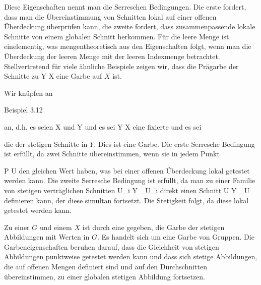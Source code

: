 Diese Eigenschaften nennt man die Serreschen Bedingungen. Die erste fordert, dass man die Übereinstimmung von Schnitten lokal auf einer offenen Überdeckung überprüfen kann, die zweite fordert, dass zusammenpassende lokale Schnitte von einem globalen Schnitt herkommen. Für die leere Menge ist
 einelementig, was mengentheoretisch aus den Eigenschaften folgt, wenn man die Überdeckung der leeren Menge mit der leeren Indexmenge betrachtet. Stellvertretend für viele ähnliche Beispiele zeigen wir, dass die Prägarbe der Schnitte zu
 {Y} {X
} {}
eine Garbe auf $X$ ist.

{





Wir knüpfen an

Beispiel 3.12

an, d.h. es seien
\mathkor {} {X} {und} {Y} {}
und es sei
 { Y } { X
} {}
eine fixierte
und es sei

 {  }

die
der stetigen Schnitte in $Y$. Dies ist eine Garbe. Die erste Serresche Bedingung ist erfüllt, da zwei Schnitte übereinstimmen, wenn sie in jedem Punkt

\mavergleichskette
{\vergleichskette
{P
}
{ \in }{ U
}
{  }{
}
{    }{
}
{   }{
}
}
{}{}{}
den gleichen Wert haben, was bei einer offenen Überdeckung lokal getestet werden kann. Die zweite Serresche Bedingung ist erfüllt, da man zu einer Familie von stetigen verträglichen Schnitten
 {U_i } { Y \vert_{U_i }
} {}
direkt einen Schnitt
 { U } { Y \vert_U
} {}
definieren kann, der diese simultan fortsetzt. Die Stetigkeit folgt, da diese lokal getestet werden kann.





}

{





Zu einer
$G$ und einem
$X$ ist durch
 eine
gegeben, die Garbe der stetigen Abbildungen mit Werten in $G$. Es handelt sich um eine Garbe von Gruppen. Die Garbeneigenschaften beruhen darauf, dass die Gleichheit von stetigen Abbildungen punktweise getestet werden kann und dass sich stetige Abbildungen, die auf offenen Mengen definiert sind und auf den Durchschnitten übereinstimmen, zu einer globalen stetigen Abbildung fortsetzen.





}






